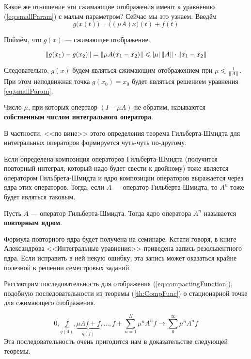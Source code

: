 \documentclass[12pt]{article}
\begin{document}
	Какое же отношение эти сжимающие отображения имеют к уравнению (\ref{eq:smallParam}) с малым параметром? 
	Сейчас мы это узнаем. Введём 
	\begin{equation}
		g\big(x(t)\big) = \big((\mu A)x\big)(t) + f(t) \label{eq:compactingFunction}
	\end{equation}
	
	Поймём, что $g(x)$ --- сжимающее отображение.
	
	$$\left\| g(x_1) - g(x_2) \right\| = \left\| \mu A(x_1 - x_2) \right\| \leqslant \left| \mu \right| \left\| A \right\| \cdot \left\| x_1 - x_2 \right\|$$
	
	Следовательно, $g(x)$ будем являться сжимающим отображением при $\mu \leqslant \frac{1}{\left\| A \right\|}$. При этом
	неподвижная точка $g(x_0) = x_0$ будет являться решением уравнения \ref{eq:smallParam}.
	
	\begin{defi}
		Число $\mu$, при которых опертаор $(I - \mu A)$ не обратим, называются \textbf{собственным числом
		интегрального оператора}.
	\end{defi}
	
	В частности, <<по вине>> этого определения теорема Гильберта-Шмидта для интегральных операторов формируется
	чуть-чуть по-другому.
	
	Если определена композиция операторов Гильберта-Шмидта (получится повторный интеграл, который надо будет 
	свести к двойному) тоже является оператором Гильбрета-Шмидта и ядро композиции операторов выражается 
	через ядра этих операторов. Тогда, если $A$ --- оператор Гильберта-Шмидта, то $A^n$ тоже будет являться
	таковым.
	
	\begin{defi}
		Пусть $A$ --- оператор Гильберта-Шмидта. Тогда ядро оператора $A^n$ называется \textbf{повторным ядром}.
	\end{defi}
	
	{\footnotesize
	Формула повторного ядра будет получена на семинаре. Кстати говоря, в книге Александрова <<Интегральные уравнения>>
	приведена запись резольвентного ядра. Если исправить в ней некую ошибку, эта запись может оказаться крайне полезной
	в решении семестровых заданий.\par
	}
	
	Рассмотрим последовательность для отображения (\ref{eq:compactingFunction}), подобную последовательности
	из теоремы (\ref{th:CompFunc}) о стационарной точке для сжимающего отображения.
	
	$$0, \underbrace{f}_{g(0)}, \underbrace{\mu Af + f}_{g(f)}, \ldots, f + \sum_{n=1}^N \mu^nA^nf \rightarrow \sum_0^{\infty} \mu^nA^n f$$
	Эта последовательность очень пригодится нам в доказательстве следующей теоремы.	
	
\end{document}
